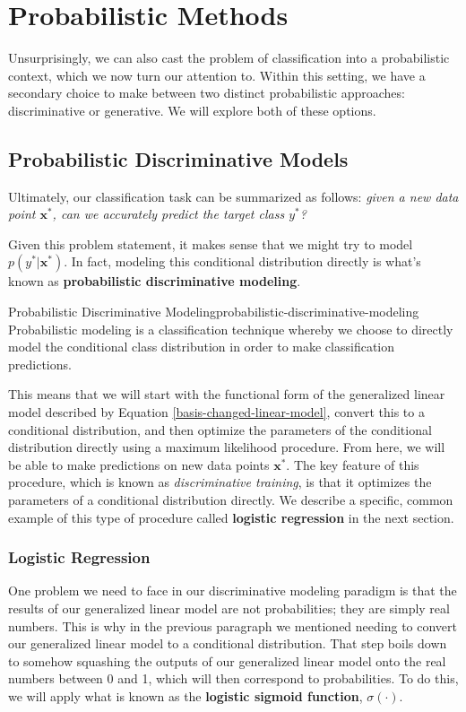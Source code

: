 \section{Probabilistic Methods}
Unsurprisingly, we can also cast the problem of classification into a probabilistic context, which we now turn our attention to. Within this setting, we have a secondary choice to make between two distinct probabilistic approaches: discriminative or generative. We will explore both of these options.

\subsection{Probabilistic Discriminative Models}
Ultimately, our classification task can be summarized as follows: \textit{given a new data point $\textbf{x}^{*}$, can we accurately predict the target class $y^{*}$?}

Given this problem statement, it makes sense that we might try to model $p(y^*|\textbf{x}^*)$. In fact, modeling this conditional distribution directly is what's known as \textbf{probabilistic discriminative modeling}.

\begin{definition}{Probabilistic Discriminative Modeling}{probabilistic-discriminative-modeling}
    Probabilistic modeling is a classification technique whereby we choose to directly model the conditional class distribution in order to make classification predictions.
\end{definition}

This means that we will start with the functional form of the generalized linear model described by Equation \ref{basis-changed-linear-model}, convert this to a conditional distribution, and then optimize the parameters of the conditional distribution directly using a maximum likelihood procedure. From here, we will be able to make predictions on new data points $\textbf{x}^{*}$. The key feature of this procedure, which is known as \textit{discriminative training}, is that it optimizes the parameters of a conditional distribution directly. We describe a specific, common example of this type of procedure called \textbf{logistic regression} in the next section.

\subsubsection{Logistic Regression}
One problem we need to face in our discriminative modeling paradigm is that the results of our generalized linear model are not probabilities; they are simply real numbers. This is why in the previous paragraph we mentioned needing to convert our generalized linear model to a conditional distribution. That step boils down to somehow squashing the outputs of our generalized linear model onto the real numbers between 0 and 1, which will then correspond to probabilities. To do this, we will apply what is known as the \textbf{logistic sigmoid function}, $\sigma(\cdot)$.

